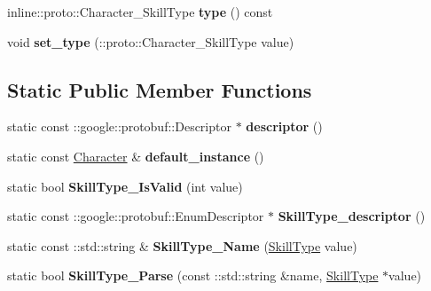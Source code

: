 \begin{DoxyCompactItemize}
\item 
\hypertarget{classproto_1_1_character_ad6b2c8d8c26c1db9c92e3102531024b3}{}inline\+::proto\+::\+Character\+\_\+\+Skill\+Type {\bfseries type} () const \label{classproto_1_1_character_ad6b2c8d8c26c1db9c92e3102531024b3}

\item 
\hypertarget{classproto_1_1_character_ace03d0678137bbbd620f0856a060e632}{}void {\bfseries set\+\_\+type} (\+::proto\+::\+Character\+\_\+\+Skill\+Type value)\label{classproto_1_1_character_ace03d0678137bbbd620f0856a060e632}

\end{DoxyCompactItemize}
\subsection*{Static Public Member Functions}
\begin{DoxyCompactItemize}
\item 
\hypertarget{classproto_1_1_character_af5ece1da02fa96963d539411dbc4b65f}{}static const \+::google\+::protobuf\+::\+Descriptor $\ast$ {\bfseries descriptor} ()\label{classproto_1_1_character_af5ece1da02fa96963d539411dbc4b65f}

\item 
\hypertarget{classproto_1_1_character_ad616cfe1d5e99d64cf20493e6a122b68}{}static const \hyperlink{classproto_1_1_character}{Character} \& {\bfseries default\+\_\+instance} ()\label{classproto_1_1_character_ad616cfe1d5e99d64cf20493e6a122b68}

\item 
\hypertarget{classproto_1_1_character_a29d00a3b85902550a5b8c328b4f779cf}{}static bool {\bfseries Skill\+Type\+\_\+\+Is\+Valid} (int value)\label{classproto_1_1_character_a29d00a3b85902550a5b8c328b4f779cf}

\item 
\hypertarget{classproto_1_1_character_af69bbf0fa24913107d34bbf76add41fd}{}static const \+::google\+::protobuf\+::\+Enum\+Descriptor $\ast$ {\bfseries Skill\+Type\+\_\+descriptor} ()\label{classproto_1_1_character_af69bbf0fa24913107d34bbf76add41fd}

\item 
\hypertarget{classproto_1_1_character_aeb1b5c408bee032a2e35a05964e36d46}{}static const \+::std\+::string \& {\bfseries Skill\+Type\+\_\+\+Name} (\hyperlink{class_skill_type}{Skill\+Type} value)\label{classproto_1_1_character_aeb1b5c408bee032a2e35a05964e36d46}

\item 
\hypertarget{classproto_1_1_character_a4da873396509469a08d4aa9194a8e364}{}static bool {\bfseries Skill\+Type\+\_\+\+Parse} (const \+::std\+::string \&name, \hyperlink{class_skill_type}{Skill\+Type} $\ast$value)\label{classproto_1_1_character_a4da873396509469a08d4aa9194a8e364}

\end{DoxyCompactItemize}
